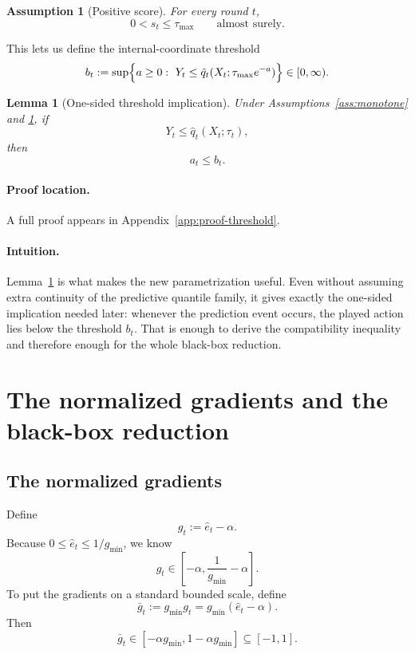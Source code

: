 \documentclass[11pt]{article}
\newtheorem{lemma}{Lemma}
\newtheorem{assumption}{Assumption}
\newcommand{\1}{\mathbf{1}}
\begin{document}
\begin{assumption}[Positive score]
\label{ass:score-positive}
For every round $t$,
\[
0<s_t\le \tau_{\max}
\qquad\text{almost surely.}
\]
\end{assumption}

This lets us define the internal-coordinate threshold
\[
b_t
:=
\sup\Bigl\{
a\ge 0:\ Y_t\le \hat q_t(X_t;\tau_{\max}e^{-a})
\Bigr\}\in[0,\infty).
\]

\begin{lemma}[One-sided threshold implication]
\label{lem:threshold}
Under Assumptions~\ref{ass:monotone} and \ref{ass:score-positive}, if
\[
Y_t\le \hat q_t(X_t;\tau_t),
\]
then
\[
a_t\le b_t.
\]
\end{lemma}

\paragraph{Proof location.} A full proof appears in Appendix~\ref{app:proof-threshold}.


\paragraph{Intuition.} Lemma~\ref{lem:threshold} is what makes the new parametrization useful. Even without assuming extra continuity of the predictive quantile family, it gives exactly the one-sided implication needed later: whenever the prediction event occurs, the played action lies below the threshold \(b_t\). That is enough to derive the compatibility inequality and therefore enough for the whole black-box reduction.

\section{The normalized gradients and the black-box reduction}
\label{sec:blackbox}

\subsection{The normalized gradients}

Define
\[
g_t:=\hat e_t-\alpha.
\]
Because $0\le \hat e_t\le 1/g_{\min}$, we know
\[
g_t\in\left[-\alpha,\frac{1}{g_{\min}}-\alpha\right].
\]
To put the gradients on a standard bounded scale, define
\begin{equation}
\label{eq:normalized-gradient}
\bar g_t:=g_{\min}g_t=g_{\min}(\hat e_t-\alpha).
\end{equation}
Then
\[
\bar g_t\in[-\alpha g_{\min},1-\alpha g_{\min}]\subseteq[-1,1].
\]
\end{document}
